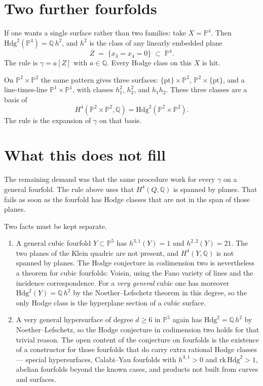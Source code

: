\documentclass[11pt,a4paper]{article}
\newcommand{\Q}{\mathbb{Q}}
\newcommand{\Pspace}{\mathbb{P}}
\theoremstyle{definition}
\theoremstyle{remark}
\begin{document}
\section{Two further fourfolds}

If one wants a single surface rather than two families: take
\(X=\Pspace^4\). Then \(\mathrm{Hdg}^2(\Pspace^4)=\Q\,h^2\), and \(h^2\)
is the class of any linearly embedded plane
\begin{equation}
\label{eq:p4}
Z\;=\;\bigl\{x_3=x_4=0\bigr\}\;\subset\;\Pspace^4.
\end{equation}
The rule is \(\gamma=a[Z]\) with \(a\in\Q\). Every Hodge class on this
\(X\) is hit.

On \(\Pspace^2\times\Pspace^2\) the same pattern gives three surfaces:
\(\{\mathrm{pt}\}\times\Pspace^2\), \(\Pspace^2\times\{\mathrm{pt}\}\),
and a line-times-line \(\Pspace^1\times\Pspace^1\), with classes
\(h_1^2\), \(h_2^2\), and \(h_1 h_2\). These three classes are a basis of
\[
H^4(\Pspace^2\times\Pspace^2,\Q)=\mathrm{Hdg}^2(\Pspace^2\times\Pspace^2).
\]
The rule is the expansion of \(\gamma\) on that basis.

\section{What this does not fill}

The remaining demand was that the same procedure work for every
\(\gamma\) on a general fourfold. The rule above uses that
\(H^4(Q,\Q)\) is spanned by planes. That fails as soon as the fourfold
has Hodge classes that are not in the span of those planes.

Two facts must be kept separate.

\begin{enumerate}[leftmargin=1.6em]
\item A general cubic fourfold \(Y\subset\Pspace^5\) has
\(h^{3,1}(Y)=1\) and \(h^{2,2}(Y)=21\). The two planes of the Klein
quadric are not present, and \(H^4(Y,\Q)\) is not spanned by planes.
The Hodge conjecture in codimension two is nevertheless a theorem for
cubic fourfolds: Voisin, using the Fano variety of lines and the
incidence correspondence. For a \emph{very general} cubic one has
moreover \(\mathrm{Hdg}^2(Y)=\Q\,h^2\) by the Noether--Lefschetz
theorem in this degree, so the only Hodge class is the hyperplane
section of a cubic surface.
\item A very general hypersurface of degree \(d\ge 6\) in \(\Pspace^5\)
again has \(\mathrm{Hdg}^2=\Q\,h^2\) by Noether--Lefschetz, so the
Hodge conjecture in codimension two holds for that trivial reason.
The open content of the conjecture on fourfolds is the existence of a
constructor for those fourfolds that do carry extra rational Hodge
classes --- special hypersurfaces, Calabi--Yau fourfolds with
\(h^{3,1}>0\) and \(\mathrm{rk}\,\mathrm{Hdg}^2>1\), abelian fourfolds
beyond the known cases, and products not built from curves and
surfaces.
\end{enumerate}
\end{document}

